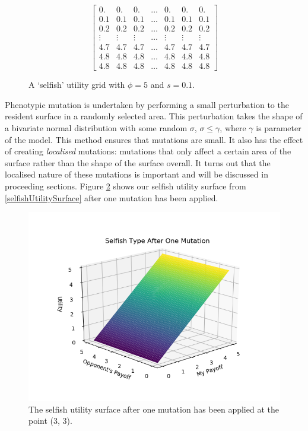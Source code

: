 \documentclass[11pt]{book}
\newcommand*{\np}{\par\noindent\newline}
\begin{document}
\begin{figure}
\[
	\begin{bmatrix} 
	0. & 0. & 0. & \dots & 0. & 0. & 0.\\
	0.1 & 0.1 & 0.1 & \dots & 0.1 & 0.1 & 0.1\\
	0.2 & 0.2 & 0.2 & \dots & 0.2 & 0.2 & 0.2\\
	\vdots & \vdots & \vdots & \dots & \vdots &\vdots &\vdots\\
	4.7 & 4.7 & 4.7 & \dots & 4.7 & 4.7 & 4.7\\
	4.8 & 4.8 & 4.8 & \dots & 4.8 & 4.8 & 4.8\\
	4.8 & 4.8 & 4.8 & \dots & 4.8 & 4.8 & 4.8 
	\end{bmatrix}
\]
\caption{A `selfish' utility grid with $\phi = 5$ and $s = 0.1$.}
\label{selfishUtilityGrid}
\end{figure}

\np Phenotypic mutation is undertaken by performing a small perturbation to the resident surface in a randomly selected area.
This perturbation takes the shape of a bivariate normal distribution with some random $\sigma$, $\sigma \leq \gamma$, where $\gamma$ is parameter of the model.
This method ensures that mutations are small.
It also has the effect of creating \textit{localised} mutations: mutations that only affect a certain area of the surface rather than the shape of the surface overall.
It turns out that the localised nature of these mutations is important and will be discussed in proceeding sections.
Figure \ref{selfishUtilitySurfaceOneMutation} shows our selfish utility surface from \ref{selfishUtilitySurface} after one mutation has been applied.

\begin{figure}
	\centering
	\includegraphics[scale=0.7]{resources/one_mutation.png}
	\caption{The selfish utility surface after one mutation has been applied at the point (3, 3).}
	\label{selfishUtilitySurfaceOneMutation}
\end{figure}
\end{document}
